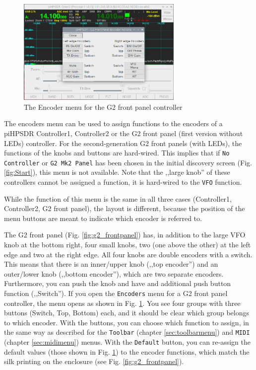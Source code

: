 \documentclass[12pt]{book}
\def\rett#1{\texttt{\color{red}#1}}
\def\bltt#1{\texttt{\color{blue}#1}}
\def\pH{pi\-HPSDR\xspace}
\begin{document}
\begin{figure}[ht]
\center
\includegraphics[width=8cm]{EncoderMenuG2.png}
\caption{The Encoder menu for the G2 front panel controller}
\label{fig:EncoderMenuG2}
\end{figure}
The encoders menu can be used to assign functions to the encoders of a
\pH Controller1, Controller2 or the G2 front panel (first version without LEDs)
controller. For the second-generation G2 front panels (with LEDs), the functions
of the knobs and buttons are hard-wired.
This implies that if \texttt{No Controller} or \texttt{G2 Mk2 Panel} has been chosen
in the initial discovery screen
(Fig. \ref{fig:Start}), this menu is not available.
Note that the ,,large knob'' of these controllers
cannot be assigned a function, it is hard-wired to the \bltt{VFO} function.



While the function of this menu is the same in all three cases (Controller1, Controller2,
G2 front panel), the layout is different, because the position of the menu buttons
are meant to indicate which encoder is referred to.



The G2 front panel (Fig. \ref{fig:g2_frontpanel}) has,
in addition to the large VFO knob at the bottom right,
four small knobs, two (one above the other)
at the left edge and two at the right edge. All four knobs are double encoders with
a switch. This means that there is an inner/upper knob (,,top encoder'')
and an outer/lower knob (,,bottom encoder''), which
are two separate encoders. Furthermore, you can push the knob and have and additional
push button function (,,Switch''). If you open the \bltt{Encoders} menu for
a G2 front panel controller, the menu opens as shown in Fig. \ref{fig:EncoderMenuG2}.
You see four groups with three buttons (Switch, Top, Bottom) each, and it should be
clear which group belongs to which encoder. With the buttons, you can choose which function
to assign, in the same way as described for the \bltt{Toolbar} (chapter \ref{sec:toolbarmenu})
and \bltt{MIDI} (chapter \ref{sec:midimenu}) menus. With the \rett{Default} button, you can
re-assign the default values (those shown in Fig. \ref{fig:EncoderMenuG2})
to the encoder functions, which match the silk printing
on the enclosure (see Fig. \ref{fig:g2_frontpanel}).
\end{document}
